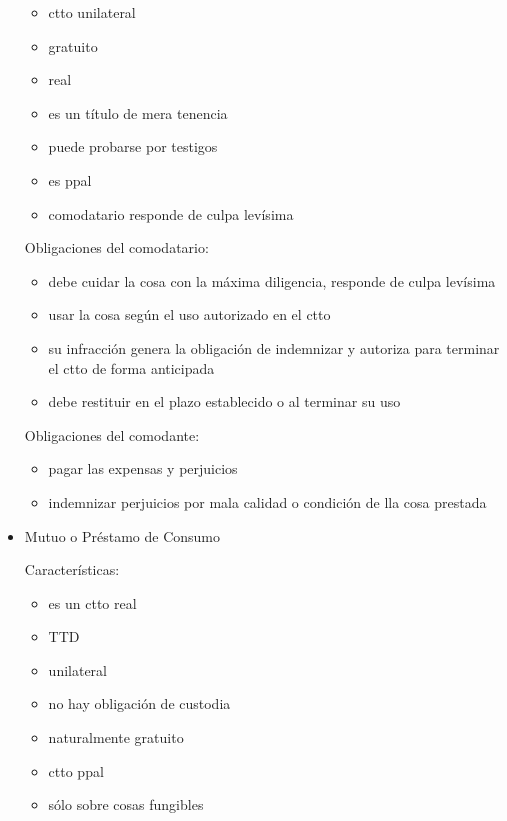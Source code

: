 \documentclass[]{article}
\providecommand{\tightlist}{%
  \setlength{\itemsep}{0pt}\setlength{\parskip}{0pt}}
\begin{document}
\begin{itemize}
  \begin{itemize}
  \tightlist
  \item
    ctto unilateral
  \item
    gratuito
  \item
    real
  \item
    es un título de mera tenencia
  \item
    puede probarse por testigos
  \item
    es ppal
  \item
    comodatario responde de culpa levísima
  \end{itemize}

  Obligaciones del comodatario:

  \begin{itemize}
  \tightlist
  \item
    debe cuidar la cosa con la máxima diligencia, responde de culpa
    levísima
  \item
    usar la cosa según el uso autorizado en el ctto
  \item
    su infracción genera la obligación de indemnizar y autoriza para
    terminar el ctto de forma anticipada
  \item
    debe restituir en el plazo establecido o al terminar su uso
  \end{itemize}

  Obligaciones del comodante:

  \begin{itemize}
  \tightlist
  \item
    pagar las expensas y perjuicios
  \item
    indemnizar perjuicios por mala calidad o condición de lla cosa
    prestada
  \end{itemize}
\item
  Mutuo o Préstamo de Consumo

  Características:

  \begin{itemize}
  \item
    es un ctto real
  \item
    TTD
  \item
    unilateral
  \item
    no hay obligación de custodia
  \item
    naturalmente gratuito
  \item
    ctto ppal
  \item
    sólo sobre cosas fungibles


\end{itemize}
\end{itemize}
\end{document}
